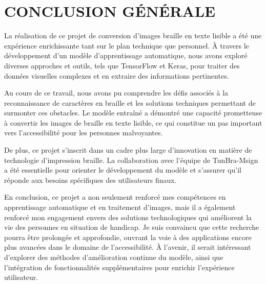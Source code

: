 \chapter*{CONCLUSION GÉNÉRALE}
\adjustmtc
\thispagestyle{MyStyle}

La réalisation de ce projet de conversion d'images braille en texte lisible a été une expérience enrichissante tant sur le plan technique que personnel. À travers le développement d'un modèle d'apprentissage automatique, nous avons exploré diverses approches et outils, tels que TensorFlow et Keras, pour traiter des données visuelles complexes et en extraire des informations pertinentes. 

Au cours de ce travail, nous avons pu comprendre les défis associés à la reconnaissance de caractères en braille et les solutions techniques permettant de surmonter ces obstacles. Le modèle entraîné a démontré une capacité prometteuse à convertir les images de braille en texte lisible, ce qui constitue un pas important vers l'accessibilité pour les personnes malvoyantes.

De plus, ce projet s'inscrit dans un cadre plus large d'innovation en matière de technologie d'impression braille. La collaboration avec l'équipe de TunBra-Msign a été essentielle pour orienter le développement du modèle et s'assurer qu'il réponde aux besoins spécifiques des utilisateurs finaux.

En conclusion, ce projet a non seulement renforcé mes compétences en apprentissage automatique et en traitement d'images, mais il a également renforcé mon engagement envers des solutions technologiques qui améliorent la vie des personnes en situation de handicap. Je suis convaincu que cette recherche pourra être prolongée et approfondie, ouvrant la voie à des applications encore plus avancées dans le domaine de l'accessibilité. À l'avenir, il serait intéressant d'explorer des méthodes d'amélioration continue du modèle, ainsi que l'intégration de fonctionnalités supplémentaires pour enrichir l'expérience utilisateur.

\par
